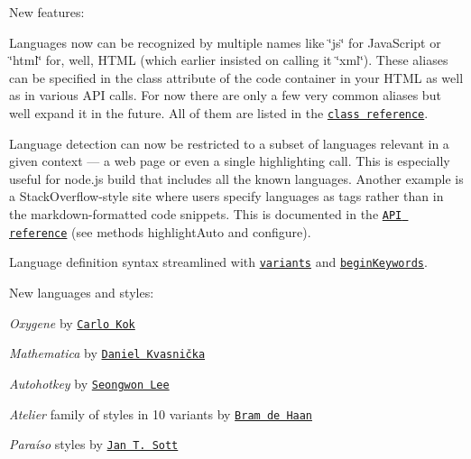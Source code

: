 New features\+:


\begin{DoxyItemize}
\item Languages now can be recognized by multiple names like \char`\"{}js\char`\"{} for Java\+Script or \char`\"{}html\char`\"{} for, well, H\+T\+ML (which earlier insisted on calling it \char`\"{}xml\char`\"{}). These aliases can be specified in the class attribute of the code container in your H\+T\+ML as well as in various A\+PI calls. For now there are only a few very common aliases but we\textquotesingle{}ll expand it in the future. All of them are listed in the \href{http://highlightjs.readthedocs.org/en/latest/css-classes-reference.html}{\tt class reference}.
\item Language detection can now be restricted to a subset of languages relevant in a given context — a web page or even a single highlighting call. This is especially useful for node.\+js build that includes all the known languages. Another example is a Stack\+Overflow-\/style site where users specify languages as tags rather than in the markdown-\/formatted code snippets. This is documented in the \href{http://highlightjs.readthedocs.org/en/latest/api.html}{\tt A\+PI reference} (see methods {\ttfamily highlight\+Auto} and {\ttfamily configure}).
\item Language definition syntax streamlined with \href{https://groups.google.com/d/topic/highlightjs/VoGC9-1p5vk/discussion}{\tt variants} and \href{https://github.com/isagalaev/highlight.js/commit/6c7fdea002eb3949577a85b3f7930137c7c3038d}{\tt begin\+Keywords}.
\end{DoxyItemize}

New languages and styles\+:


\begin{DoxyItemize}
\item {\itshape Oxygene} by \href{https://github.com/carlokok}{\tt Carlo Kok}
\item {\itshape Mathematica} by \href{https://github.com/dkvasnicka}{\tt Daniel Kvasnička}
\item {\itshape Autohotkey} by \href{https://github.com/dlimpid}{\tt Seongwon Lee}
\item {\itshape Atelier} family of styles in 10 variants by \href{https://github.com/atelierbram}{\tt Bram de Haan}
\item {\itshape Paraíso} styles by \href{https://github.com/idleberg}{\tt Jan T. Sott}
\end{DoxyItemize}

